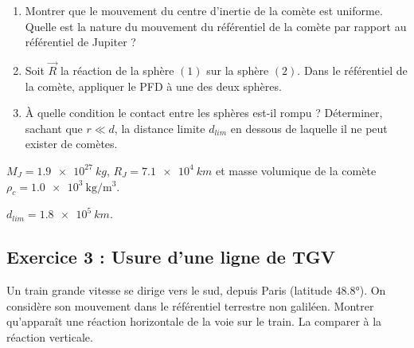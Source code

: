 \begin{enumerate}
	\item Montrer que le mouvement du centre d'inertie de la comète est uniforme. Quelle est la nature du mouvement du référentiel de la comète par rapport au référentiel de Jupiter ?
	\item Soit $\vec{R}$ la réaction de la sphère $(1)$ sur la sphère $(2)$. Dans le référentiel de la comète, appliquer le PFD à une des deux sphères.
	\item À quelle condition le contact entre les sphères est-il rompu ? Déterminer, sachant que $r \ll d$, la distance limite $d_{lim}$ en dessous de laquelle il ne peut exister de comètes.
\end{enumerate}

 $M_J = \SI{1.9e27}{kg}$, $R_J = \SI{7.1e4}{km}$ et masse volumique de la comète $\rho_c = \SI{1.0e3}{\kilogram\per\cubic\metre}$.

 $d_{lim} = \SI{1.8e5}{km}$.

\subsection{Exercice 3 : Usure d'une ligne de TGV}

Un train grande vitesse se dirige vers le sud, depuis Paris (latitude $48.8$°). On considère son mouvement dans le référentiel terrestre non galiléen. Montrer qu'apparaît une réaction horizontale de la voie sur le train. La comparer à la réaction verticale. 



